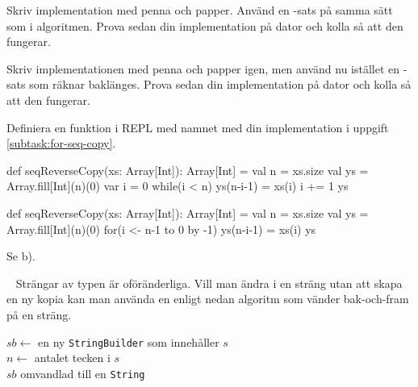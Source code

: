 \Subtask\Pen Skriv implementation med penna och papper. Använd en -sats på samma sätt som i algoritmen. Prova sedan din implementation på dator och kolla så att den fungerar.

\Subtask\Pen \label{subtask:for-seq-copy} Skriv implementationen med penna och papper igen, men använd nu istället en -sats som räknar baklänges. Prova sedan din implementation på dator och kolla så att den fungerar.

\Subtask Definiera en funktion i REPL med namnet  med din implementation i uppgift \ref{subtask:for-seq-copy}.


\SOLUTION


\TaskSolved \what


\SubtaskSolved  \begin{Code}
def seqReverseCopy(xs: Array[Int]): Array[Int] = {
  val n = xs.size
  val ys = Array.fill[Int](n)(0)
  var i = 0
  while(i < n) {
    ys(n-i-1) = xs(i)
    i += 1
  }
  ys
}
\end{Code}

\SubtaskSolved  \begin{Code}
def seqReverseCopy(xs: Array[Int]): Array[Int] = {
  val n = xs.size
  val ys = Array.fill[Int](n)(0)
  for(i <- n-1 to 0 by -1) ys(n-i-1) = xs(i)
  ys
}
\end{Code}

\SubtaskSolved  Se b).



\QUESTEND









\QUESTBEGIN

\Task  \what~  Strängar av typen  är oföränderliga. Vill man ändra i en sträng utan att skapa en ny kopia kan man använda en  enligt nedan algoritm som vänder bak-och-fram på en sträng.

\begin{algorithm}[H]

 $sb \leftarrow$ en ny \texttt{StringBuilder} som innehåller $s$ \\
 $n \leftarrow$ antalet tecken i $s$\\
 \Return $sb$ omvandlad till en \texttt{String}
\end{algorithm}

